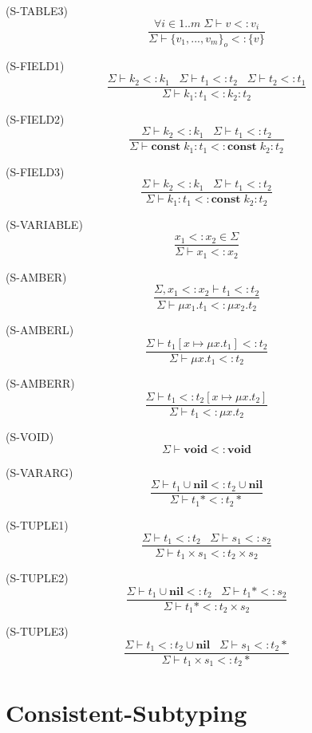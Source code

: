 \documentclass{paper}
\newcommand{\Nil}{\mathbf{nil}}
\newcommand{\Void}{\mathbf{void}}
\newcommand{\Const}{\mathbf{const}}
\newcommand{\mylabel}[1]{\; (\textsc{#1})}
\newcommand{\senv}{\Sigma}
\newcommand{\subtype}{<:}
\begin{document}
\mylabel{S-TABLE3}
\[
\dfrac{\forall i \in 1..m \; \senv \vdash v \subtype v_{i}}
      {\senv \vdash \{v_{1}, ..., v_{m}\}_{o} \subtype \{v\}} 
\]

\mylabel{S-FIELD1}
\[
\dfrac{\senv \vdash k_{2} \subtype k_{1} \;\;\;
       \senv \vdash t_{1} \subtype t_{2} \;\;\;
       \senv \vdash t_{2} \subtype t_{1}}
      {\senv \vdash k_{1}:t_{1} \subtype k_{2}:t_{2}}
\]

\mylabel{S-FIELD2}
\[
\dfrac{\senv \vdash k_{2} \subtype k_{1} \;\;\;
       \senv \vdash t_{1} \subtype t_{2}}
      {\senv \vdash \Const \; k_{1}:t_{1} \subtype \Const \; k_{2}:t_{2}}
\]

\mylabel{S-FIELD3}
\[
\dfrac{\senv \vdash k_{2} \subtype k_{1} \;\;\;
       \senv \vdash t_{1} \subtype t_{2}}
      {\senv \vdash k_{1}:t_{1} \subtype \Const \; k_{2}:t_{2}}
\]

\mylabel{S-VARIABLE}
\[
\dfrac{x_{1} \subtype x_{2} \in \senv}
      {\senv \vdash x_{1} \subtype x_{2}}
\]

\mylabel{S-AMBER}
\[
\dfrac{\senv, x_{1} \subtype x_{2} \vdash t_{1} \subtype t_{2}}
      {\senv \vdash \mu x_{1}.t_{1} \subtype \mu x_{2}.t_{2}}
\]

\mylabel{S-AMBERL}
\[
\dfrac{\senv \vdash t_{1}[x \mapsto \mu x.t_{1}] \subtype t_{2}}
      {\senv \vdash \mu x.t_{1} \subtype t_{2}}
\]

\mylabel{S-AMBERR}
\[
\dfrac{\senv \vdash t_{1} \subtype t_{2}[x \mapsto \mu x.t_{2}]}
      {\senv \vdash t_{1} \subtype \mu x.t_{2}}
\]

\mylabel{S-VOID}
\[
\senv \vdash \Void \subtype \Void
\]

\mylabel{S-VARARG}
\[
\dfrac{\senv \vdash t_{1} \cup \Nil \subtype t_{2} \cup \Nil}
      {\senv \vdash t_{1}* \subtype t_{2}*}
\]

\mylabel{S-TUPLE1}
\[
\dfrac{\senv \vdash t_{1} \subtype t_{2} \;\;\;
       \senv \vdash s_{1} \subtype s_{2}}
      {\senv \vdash t_{1} \times s_{1} \subtype t_{2} \times s_{2}}
\]

\mylabel{S-TUPLE2}
\[
\dfrac{\senv \vdash t_{1} \cup \Nil \subtype t_{2} \;\;\;
       \senv \vdash t_{1}* \subtype s_{2}}
      {\senv \vdash t_{1}* \subtype t_{2} \times s_{2}}
\]

\mylabel{S-TUPLE3}
\[
\dfrac{\senv \vdash t_{1} \subtype t_{2} \cup \Nil \;\;\;
       \senv \vdash s_{1} \subtype t_{2}*}
      {\senv \vdash t_{1} \times s_{1} \subtype t_{2}*}
\]

\section{Consistent-Subtyping}
\end{document}
